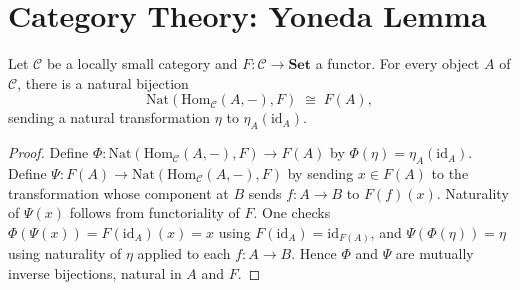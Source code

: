 \section{Category Theory: Yoneda Lemma}

\begin{theorem}[yoneda]
Let $\mathcal{C}$ be a locally small category and $F : \mathcal{C} \to \mathbf{Set}$
a functor. For every object $A$ of $\mathcal{C}$, there is a natural bijection
\[
\mathrm{Nat}(\mathrm{Hom}_{\mathcal{C}}(A, -), F) \;\cong\; F(A),
\]
sending a natural transformation $\eta$ to $\eta_A(\mathrm{id}_A)$.
\end{theorem}

\begin{proof}
Define $\Phi : \mathrm{Nat}(\mathrm{Hom}_{\mathcal{C}}(A,-), F) \to F(A)$ by
$\Phi(\eta) = \eta_A(\mathrm{id}_A)$. Define $\Psi : F(A) \to \mathrm{Nat}(\mathrm{Hom}_{\mathcal{C}}(A,-), F)$
by sending $x \in F(A)$ to the transformation whose component at $B$ sends
$f : A \to B$ to $F(f)(x)$. Naturality of $\Psi(x)$ follows from
functoriality of $F$. One checks $\Phi(\Psi(x)) = F(\mathrm{id}_A)(x) = x$ using
$F(\mathrm{id}_A) = \mathrm{id}_{F(A)}$, and $\Psi(\Phi(\eta)) = \eta$ using
naturality of $\eta$ applied to each $f : A \to B$. Hence $\Phi$ and $\Psi$ are
mutually inverse bijections, natural in $A$ and $F$.
\end{proof}
